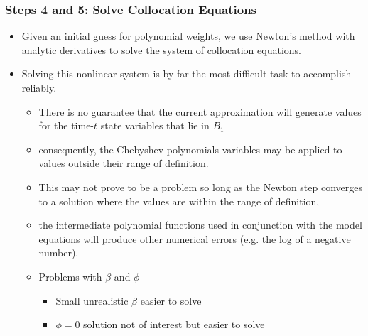 \documentclass[tikz]{beamer}
\begin{document}
\begin{frame}

\frametitle{Steps 4 and 5: Solve Collocation Equations}
\begin{itemize}
\item Given an initial guess for polynomial weights, we use Newton's
  method with analytic derivatives to solve the system of collocation
  equations.
\item Solving this nonlinear system is by far the most difficult task
  to accomplish reliably.
  \begin{itemize}
  \item There is no guarantee that the current approximation will
    generate values for the time-$t$ state variables that lie in
    $B_{1}$
  \item consequently, the Chebyshev polynomials variables may be
    applied to values outside their range of definition.
  \item This may not prove to be a problem so long as the Newton step
    converges to a solution where the values are within the range of
    definition,
  \item the intermediate polynomial functions used %
    {in conjunction} with the model equations will produce other
    numerical errors (e.g. the log of a negative number).
  \item {Problems with $\beta$ and $\phi$}
    \begin{itemize}
    \item Small unrealistic $\beta$ easier to solve
    \item $\phi=0$ solution not of interest but easier to solve
    \end{itemize}
  \end{itemize}
\end{itemize}



\end{frame}
\end{document}

